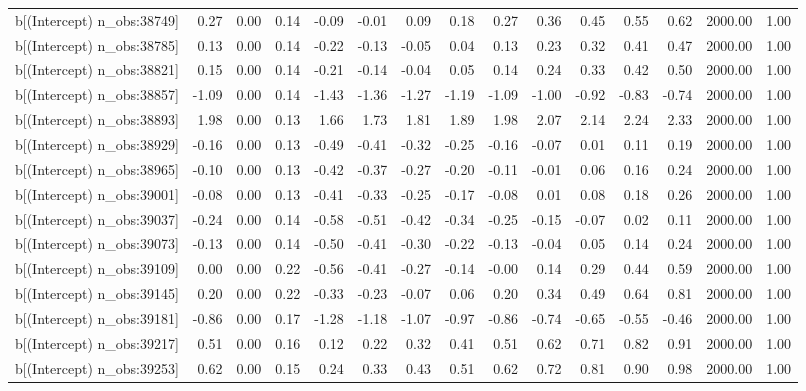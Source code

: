 \begin{table}[ht]
\begin{tabular}{rrrrrrrrrrrrrrr}
  b[(Intercept) n\_obs:38749] & 0.27 & 0.00 & 0.14 & -0.09 & -0.01 & 0.09 & 0.18 & 0.27 & 0.36 & 0.45 & 0.55 & 0.62 & 2000.00 & 1.00 \\ 
  b[(Intercept) n\_obs:38785] & 0.13 & 0.00 & 0.14 & -0.22 & -0.13 & -0.05 & 0.04 & 0.13 & 0.23 & 0.32 & 0.41 & 0.47 & 2000.00 & 1.00 \\ 
  b[(Intercept) n\_obs:38821] & 0.15 & 0.00 & 0.14 & -0.21 & -0.14 & -0.04 & 0.05 & 0.14 & 0.24 & 0.33 & 0.42 & 0.50 & 2000.00 & 1.00 \\ 
  b[(Intercept) n\_obs:38857] & -1.09 & 0.00 & 0.14 & -1.43 & -1.36 & -1.27 & -1.19 & -1.09 & -1.00 & -0.92 & -0.83 & -0.74 & 2000.00 & 1.00 \\ 
  b[(Intercept) n\_obs:38893] & 1.98 & 0.00 & 0.13 & 1.66 & 1.73 & 1.81 & 1.89 & 1.98 & 2.07 & 2.14 & 2.24 & 2.33 & 2000.00 & 1.00 \\ 
  b[(Intercept) n\_obs:38929] & -0.16 & 0.00 & 0.13 & -0.49 & -0.41 & -0.32 & -0.25 & -0.16 & -0.07 & 0.01 & 0.11 & 0.19 & 2000.00 & 1.00 \\ 
  b[(Intercept) n\_obs:38965] & -0.10 & 0.00 & 0.13 & -0.42 & -0.37 & -0.27 & -0.20 & -0.11 & -0.01 & 0.06 & 0.16 & 0.24 & 2000.00 & 1.00 \\ 
  b[(Intercept) n\_obs:39001] & -0.08 & 0.00 & 0.13 & -0.41 & -0.33 & -0.25 & -0.17 & -0.08 & 0.01 & 0.08 & 0.18 & 0.26 & 2000.00 & 1.00 \\ 
  b[(Intercept) n\_obs:39037] & -0.24 & 0.00 & 0.14 & -0.58 & -0.51 & -0.42 & -0.34 & -0.25 & -0.15 & -0.07 & 0.02 & 0.11 & 2000.00 & 1.00 \\ 
  b[(Intercept) n\_obs:39073] & -0.13 & 0.00 & 0.14 & -0.50 & -0.41 & -0.30 & -0.22 & -0.13 & -0.04 & 0.05 & 0.14 & 0.24 & 2000.00 & 1.00 \\ 
  b[(Intercept) n\_obs:39109] & 0.00 & 0.00 & 0.22 & -0.56 & -0.41 & -0.27 & -0.14 & -0.00 & 0.14 & 0.29 & 0.44 & 0.59 & 2000.00 & 1.00 \\ 
  b[(Intercept) n\_obs:39145] & 0.20 & 0.00 & 0.22 & -0.33 & -0.23 & -0.07 & 0.06 & 0.20 & 0.34 & 0.49 & 0.64 & 0.81 & 2000.00 & 1.00 \\ 
  b[(Intercept) n\_obs:39181] & -0.86 & 0.00 & 0.17 & -1.28 & -1.18 & -1.07 & -0.97 & -0.86 & -0.74 & -0.65 & -0.55 & -0.46 & 2000.00 & 1.00 \\ 
  b[(Intercept) n\_obs:39217] & 0.51 & 0.00 & 0.16 & 0.12 & 0.22 & 0.32 & 0.41 & 0.51 & 0.62 & 0.71 & 0.82 & 0.91 & 2000.00 & 1.00 \\ 
  b[(Intercept) n\_obs:39253] & 0.62 & 0.00 & 0.15 & 0.24 & 0.33 & 0.43 & 0.51 & 0.62 & 0.72 & 0.81 & 0.90 & 0.98 & 2000.00 & 1.00 \\ 

\end{tabular}
\end{table}
